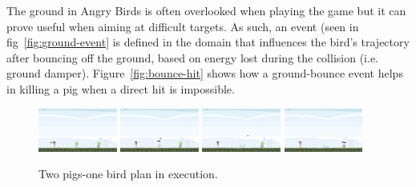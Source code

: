 The ground in Angry Birds is often overlooked when playing the game but it can prove useful when aiming at difficult targets. As such, an event (seen in fig~\ref{fig:ground-event} is defined in the domain that influences the bird's trajectory after bouncing off the ground, based on energy lost during the collision (i.e. ground damper). Figure~\ref{fig:bounce-hit} shows how a ground-bounce event helps in killing a pig when a direct hit is impossible.
\begin{figure}
\begin{center}
\includegraphics[width=0.23\textwidth]{images/double1.png}
\includegraphics[width=0.23\textwidth]{images/double2.png}
\includegraphics[width=0.23\textwidth]{images/double3.png}
\includegraphics[width=0.23\textwidth]{images/double4.png}
\end{center}
\caption{Two pigs-one bird plan in execution.}
\label{fig:double-hit}
\end{figure}

